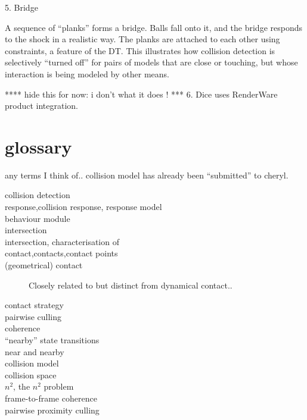 \documentclass[11pt]{article}
\begin{document}
5. Bridge

A sequence of ``planks'' forms a bridge. Balls fall onto it, and the bridge
 responds to the shock in a realistic way.
The planks are attached to each other using constraints, a feature of the
 DT.
This illustrates how collision detection is selectively ``turned off'' for
 pairs of models that are close or touching, but whose interaction is being
 modeled by other means.

**** hide this for now: i don't what it does ! ***
6. Dice
  uses RenderWare product integration.
 








\section{ glossary }

any terms I think of..
collision model has already been ``submitted'' to cheryl.

\begin{description}
\item[collision detection]
\item[response,collision response, response model]
\item[behaviour module]
\item[intersection]
\item[intersection, characterisation of]
\item[contact,contacts,contact points]
\item[(geometrical) contact] Closely related to but distinct from dynamical
  contact..
\item[contact strategy]
\item[pairwise culling]
\item[coherence]
\item[``nearby'' state transitions ]
\item[near and nearby]

\item[collision model]
\item[collision space]
\item[\(n^{2}\), the \(n^{2}\) problem]
\item[frame-to-frame coherence]
\item[pairwise proximity culling]
\end{description}
\end{document}
